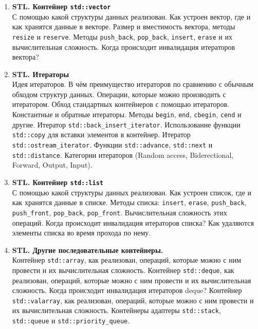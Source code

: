 \documentclass{article}
\begin{document}
\begin{enumerate}
\item \textbf{STL. Контейнер \texttt{std::vector}}\\
С помощью какой структуры данных реализован. Как устроен вектор, где и как хранятся данные в векторе. Размер и вместимость вектора, методы \texttt{resize} и \texttt{reserve}. Методы \texttt{push\_back}, \texttt{pop\_back}, \texttt{insert}, \texttt{erase} и их вычислительная сложность. Когда происходит инвалидация итераторов вектора?

\item \textbf{STL. Итераторы}\\
Идея итераторов. В чём преимущество итераторов по сравнению с обычным обходом структур данных. Операции, которые можно производить с итератором. Обход стандартных контейнеров с помощью итераторов. Константные и обратные итераторы. Методы \texttt{begin}, \texttt{end}, \texttt{cbegin}, \texttt{cend} и другие. Итератор \texttt{std::back\_insert\_iterator}. Использование функции \texttt{std::copy} для вставки элементов в контейнер. Итератор \texttt{std::ostream\_iterator}. Функции \texttt{std::advance}, \texttt{std::next} и \texttt{std::distance}. Категории итераторов (Random access, Biderectional, Forward, Output, Input).

\item \textbf{STL. Контейнер \texttt{std::list}}\\
С помощью какой структуры данных реализован. Как устроен список, где и как хранятся данные в списке. Методы списка: \texttt{insert}, \texttt{erase}, \texttt{push\_back}, \texttt{push\_front}, \texttt{pop\_back}, \texttt{pop\_front}. Вычислительная сложность этих операций. Когда происходит инвалидация итераторов списка? Как удаляются элементы списка во время прохода по нему.

\item \textbf{STL. Другие последовательные контейнеры.}\\
Контейнер \texttt{std::array}, как реализован, операций, которые можно с ним провести и их вычислительная сложность. Контейнер \texttt{std::deque}, как реализован, операций, которые можно с ним провести и их вычислительная сложность. Когда происходит инвалидация итераторов deque? Контейнер \texttt{std::valarray}, как реализован, операций, которые можно с ним провести и их вычислительная сложность. Контейнеры адаптеры \texttt{std::stack}, \texttt{std::queue} и \texttt{std::priority\_queue}.


\end{enumerate}
\end{document}
